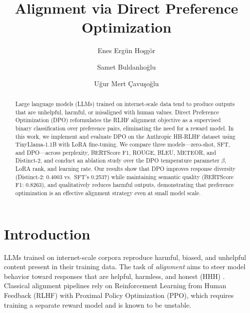 \documentclass{llncs}
\begin{document}
\title{Alignment via Direct Preference Optimization}

\author{
    Enes Ergün Hoşgör \and
    Samet Buldanlıoğlu \and
    Uğur Mert Çavuşoğlu
}


\maketitle

\begin{abstract}
Large language models (LLMs) trained on internet-scale data tend to produce outputs
that are unhelpful, harmful, or misaligned with human values. Direct Preference
Optimization (DPO) reformulates the RLHF alignment objective as a supervised binary
classification over preference pairs, eliminating the need for a reward model. In this
work, we implement and evaluate DPO on the Anthropic HH-RLHF dataset using
TinyLlama-1.1B with LoRA fine-tuning. We compare three models---zero-shot, SFT, and
DPO---across perplexity, BERTScore F1, ROUGE, BLEU, METEOR, and Distinct-2, and
conduct an ablation study over the DPO temperature parameter $\beta$, LoRA rank, and
learning rate. Our results show that DPO improves response diversity (Distinct-2:
0.4003 vs.\ SFT's 0.2537) while maintaining semantic quality (BERTScore F1: 0.8263),
and qualitatively reduces harmful outputs, demonstrating that preference optimization
is an effective alignment strategy even at small model scale.
\end{abstract}


\section{Introduction}

LLMs trained on internet-scale corpora reproduce harmful, biased, and unhelpful
content present in their training data. The task of \emph{alignment} aims to steer
model behavior toward responses that are helpful, harmless, and honest (HHH)
\cite{bai2022}. Classical alignment pipelines rely on Reinforcement Learning from
Human Feedback (RLHF) with Proximal Policy Optimization (PPO), which requires training
a separate reward model and is known to be unstable.
\end{document}
